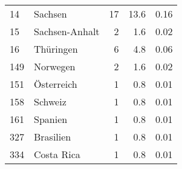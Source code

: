 \begin{longtable}{lXrrr}
        14 & \multicolumn{1}{X}{Sachsen} & %
          \num{17} &
          \num[round-mode=places,round-precision=2]{13.6} &
          \num[round-mode=places,round-precision=2]{0.16} \\

        15 & \multicolumn{1}{X}{Sachsen-Anhalt} & %
          \num{2} &
          \num[round-mode=places,round-precision=2]{1.6} &
          \num[round-mode=places,round-precision=2]{0.02} \\

        16 & \multicolumn{1}{X}{Thüringen} & %
          \num{6} &
          \num[round-mode=places,round-precision=2]{4.8} &
          \num[round-mode=places,round-precision=2]{0.06} \\

        149 & \multicolumn{1}{X}{Norwegen} & %
          \num{2} &
          \num[round-mode=places,round-precision=2]{1.6} &
          \num[round-mode=places,round-precision=2]{0.02} \\

        151 & \multicolumn{1}{X}{Österreich} & %
          \num{1} &
          \num[round-mode=places,round-precision=2]{0.8} &
          \num[round-mode=places,round-precision=2]{0.01} \\

        158 & \multicolumn{1}{X}{Schweiz} & %
          \num{1} &
          \num[round-mode=places,round-precision=2]{0.8} &
          \num[round-mode=places,round-precision=2]{0.01} \\

        161 & \multicolumn{1}{X}{Spanien} & %
          \num{1} &
          \num[round-mode=places,round-precision=2]{0.8} &
          \num[round-mode=places,round-precision=2]{0.01} \\

        327 & \multicolumn{1}{X}{Brasilien} & %
          \num{1} &
          \num[round-mode=places,round-precision=2]{0.8} &
          \num[round-mode=places,round-precision=2]{0.01} \\

        334 & \multicolumn{1}{X}{Costa Rica} & %
          \num{1} &
          \num[round-mode=places,round-precision=2]{0.8} &
          \num[round-mode=places,round-precision=2]{0.01} \\


\end{longtable}
